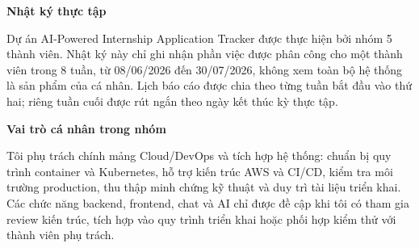 \vspace{0.5em}\noindent\textbf{Nhật ký thực tập}\par

Dự án AI-Powered Internship Application Tracker được thực hiện bởi nhóm
5 thành viên. Nhật ký này chỉ ghi nhận phần việc được phân công cho một
thành viên trong 8 tuần, từ 08/06/2026 đến 30/07/2026, không xem toàn bộ
hệ thống là sản phẩm của cá nhân. Lịch báo cáo được chia theo từng tuần
bắt đầu vào thứ hai; riêng tuần cuối được rút ngắn theo ngày kết thúc kỳ
thực tập.

\vspace{0.5em}\noindent\textbf{Vai trò cá nhân trong
nhóm}\par

Tôi phụ trách chính mảng Cloud/DevOps và tích hợp hệ thống: chuẩn bị quy
trình container và Kubernetes, hỗ trợ kiến trúc AWS và CI/CD, kiểm tra
môi trường production, thu thập minh chứng kỹ thuật và duy trì tài liệu
triển khai. Các chức năng backend, frontend, chat và AI chỉ được đề cập
khi tôi có tham gia review kiến trúc, tích hợp vào quy trình triển khai
hoặc phối hợp kiểm thử với thành viên phụ trách.

